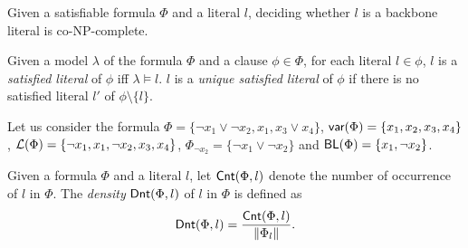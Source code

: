 \begin{theorem}
\label{thm:co-NP}\cite{Jan10}
Given a satisfiable formula $\Phi$ and a literal $l$, deciding whether $l$ is a backbone literal is co-NP-complete.
\end{theorem}


\begin{definition}
Given a model $\lambda$ of the formula $\Phi$ and a clause $\phi\in\Phi$, for each literal $l\in\phi$, $l$ is a \emph{satisfied literal}
of $\phi$ iff $\lambda\models l$. $l$ is a \emph{unique satisfied literal} of $\phi$ if there is no satisfied literal $l'$ of $\phi\setminus\{l\}$.
\end{definition}


Let us consider the formula $\Phi=\{\neg x_1 \vee \neg x_2, x_1, x_3 \vee x_4\}$,
$\textsf{var}(\Phi)=\{x_1, x_2, x_3, x_4\}$, ${\cal L}(\Phi)=\{\neg x_1, x_1, \neg x_2, x_3, x_4\}$, $\Phi_{\neg x_2}=\{\neg x_1 \vee \neg x_2\}$ and $\textsf{BL}(\Phi)=\{x_1, \neg x_2\}$.

Given a formula $\Phi$ and a literal $l$, let $\textsf{Cnt}(\Phi,l)$ denote the number of occurrence of $l$ in $\Phi$.
The \emph{density} $\textsf{Dnt}(\Phi,l)$ of $l$ in $\Phi$ is defined as
\[
\textsf{Dnt}(\Phi, l)=\frac{\textsf{Cnt}(\Phi,l)}{\|\Phi_l\|}.
\]



